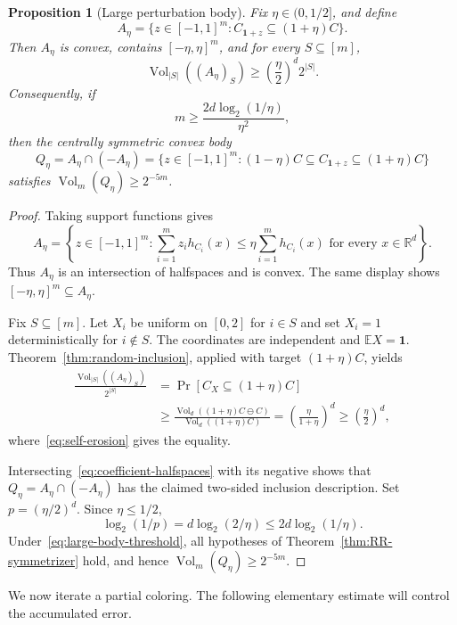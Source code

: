 \documentclass[11pt]{article}
\newtheorem{proposition}[theorem]{Proposition}
\theoremstyle{remark}
\newcommand{\R}{\mathbb{R}}
\newcommand{\E}{\mathbb{E}}
\newcommand{\Vol}{\operatorname{Vol}}
\newcommand{\one}{\bm{1}}
\newcommand{\MinkDiff}{\mathbin{\ominus}}
\begin{document}
\begin{proposition}[Large perturbation body]\label{prop:large-body}
Fix $\eta\in(0,1/2]$, and define
\[
  A_\eta=
  \{z\in[-1,1]^m:C_{\one+z}\subseteq(1+\eta)C\}.
\]
Then $A_\eta$ is convex, contains $[-\eta,\eta]^m$, and for every
$S\subseteq[m]$,
\[
  \Vol_{|S|}((A_\eta)_S)
  \geq \left(\frac{\eta}{2}\right)^d2^{|S|}.
\]
Consequently, if
\begin{equation}\label{eq:large-body-threshold}
  m\geq \frac{2d\log_2(1/\eta)}{\eta^2},
\end{equation}
then the centrally symmetric convex body
\[
  Q_\eta=A_\eta\cap(-A_\eta)
  =\{z\in[-1,1]^m:(1-\eta)C\subseteq C_{\one+z}
      \subseteq(1+\eta)C\}
\]
satisfies $\Vol_m(Q_\eta)\geq2^{-5m}$.
\end{proposition}

\begin{proof}
Taking support functions gives
\begin{equation}\label{eq:coefficient-halfspaces}
  A_\eta=
  \left\{z\in[-1,1]^m:
  \sum_{i=1}^m z_i h_{C_i}(x)
  \leq \eta\sum_{i=1}^m h_{C_i}(x)
  \text{ for every }x\in\R^d\right\}.
\end{equation}
Thus $A_\eta$ is an intersection of halfspaces and is convex.  The
same display shows $[-\eta,\eta]^m\subseteq A_\eta$.

Fix $S\subseteq[m]$.  Let $X_i$ be uniform on $[0,2]$ for $i\in S$
and set $X_i=1$ deterministically for $i\notin S$.  The coordinates are
independent and $\E X=\one$.  Theorem~\ref{thm:random-inclusion},
applied with target $(1+\eta)C$, yields
\begin{align*}
  \frac{\Vol_{|S|}((A_\eta)_S)}{2^{|S|}}
  &=\Pr[C_X\subseteq(1+\eta)C]\\
  &\geq
  \frac{\Vol_d((1+\eta)C\MinkDiff C)}
       {\Vol_d((1+\eta)C)}
   =\left(\frac{\eta}{1+\eta}\right)^d
   \geq\left(\frac{\eta}{2}\right)^d,
\end{align*}
where~\eqref{eq:self-erosion} gives the equality.

Intersecting~\eqref{eq:coefficient-halfspaces} with its negative shows
that $Q_\eta=A_\eta\cap(-A_\eta)$ has the claimed two-sided inclusion
description.  Set $p=(\eta/2)^d$.  Since $\eta\leq1/2$,
\[
  \log_2(1/p)=d\log_2(2/\eta)
  \leq2d\log_2(1/\eta).
\]
Under~\eqref{eq:large-body-threshold}, all hypotheses of
Theorem~\ref{thm:RR-symmetrizer} hold, and hence
$\Vol_m(Q_\eta)\geq2^{-5m}$.
\end{proof}

We now iterate a partial coloring.  The following elementary estimate
will control the accumulated error.
\end{document}
